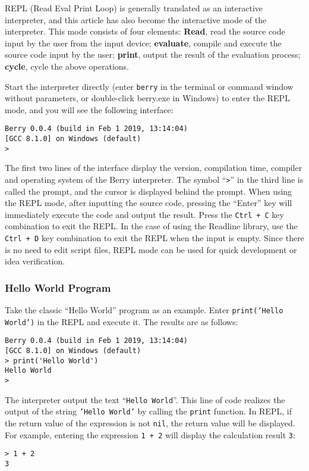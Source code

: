 REPL (Read Eval Print Loop) is generally translated as an interactive interpreter, and this article has also become the interactive mode of the interpreter. This mode consists of four elements: \textbf{Read}, read the source code input by the user from the input device; \textbf{evaluate}, compile and execute the source code input by the user; \textbf{print}, output the result of the evaluation process; \textbf{cycle}, cycle the above operations.

Start the interpreter directly (enter \texttt{berry} in the terminal or command window without parameters, or double-click berry.exe in Windows) to enter the REPL mode, and you will see the following interface:
\begin{lstlisting}[language=berry, numbers=none]
Berry 0.0.4 (build in Feb 1 2019, 13:14:04)
[GCC 8.1.0] on Windows (default)
>
\end{lstlisting}
The first two lines of the interface display the version, compilation time, compiler and operating system of the Berry interpreter. The symbol ``\texttt{>}'' in the third line is called the prompt, and the cursor is displayed behind the prompt. When using the REPL mode, after inputting the source code, pressing the “Enter” key will immediately execute the code and output the result. Press the \texttt{Ctrl\,+\,C} key combination to exit the REPL. In the case of using the Readline library, use the \texttt{Ctrl\,+\,D} key combination to exit the REPL when the input is empty. Since there is no need to edit script files, REPL mode can be used for quick development or idea verification.

\subsubsection {Hello World Program}Take the classic ``Hello World'' program as an example. Enter \texttt{print('Hello World')} in the REPL and execute it. The results are as follows:
\begin{lstlisting}[language=berry, numbers=none]
Berry 0.0.4 (build in Feb 1 2019, 13:14:04)
[GCC 8.1.0] on Windows (default)
> print('Hello World')
Hello World
>
\end{lstlisting}
The interpreter output the text ``\texttt{Hello World}''. This line of code realizes the output of the string \texttt{'Hello World'} by calling the \texttt{print} function. In REPL, if the return value of the expression is not \texttt{nil}, the return value will be displayed. For example, entering the expression \texttt{1 + 2} will display the calculation result \texttt{3}:
\begin{lstlisting}[language=berry, numbers=none]
> 1 + 2
3
\end{lstlisting}


